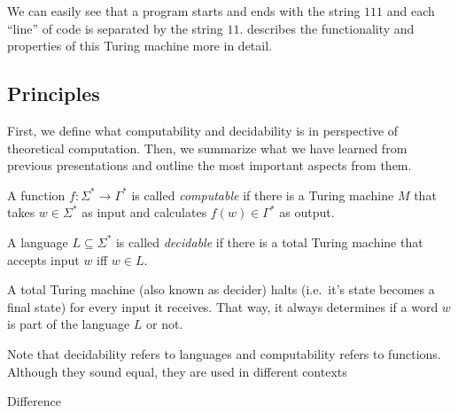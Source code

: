 \documentclass[journal]{IEEEtran}
\begin{document}
We can easily see that a program starts and ends with the string $111$ and each ``line'' of code is separated by the string $11$.
\cite{Wegener2013:2.4} describes the functionality and properties of this Turing machine more in detail.

\subsection{Principles}

First, we define what computability and decidability is in perspective of theoretical computation. Then, we summarize what we have learned from previous presentations and outline the most important aspects from them.

\begin{definition}[Computability]
  A function $f\colon \Sigma^* \to \Gamma^*$ is called \textit{computable} if there is a Turing machine $M$ that takes $w \in \Sigma^*$ as input and calculates $f(w) \in \Gamma^*$ as output.~\cite{Wegener2013:2.1.1}
\end{definition}


\begin{definition}[Decidability]
  A language $L \subseteq \Sigma^*$ is called \textit{decidable} if there is a total Turing machine that accepts input $w$ iff $w \in L$.~\cite{Wegener2013:2.1.2}
\end{definition}

A total Turing machine (also known as decider) halts (i.e.~it's state becomes a final state) for every input it receives. That way, it always determines if a word $w$ is part of the language $L$ or not.

Note that decidability refers to languages and computability refers to functions. Although they sound equal, they are used in different contexts

Difference






\end{document}
